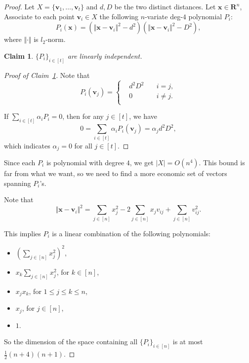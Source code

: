 \documentclass{article}
\newtheorem{claim}[theorem]{Claim}
\theoremstyle{definition}
\begin{document}
\begin{proof}
    Let $X=\{ \boldsymbol{v}_{1},\ldots,\boldsymbol{v}_{t} \}$ and $d,D$ be the two distinct distances. Let $\boldsymbol{x}\in \mathbf{R}^{n}$, Associate to each point $\boldsymbol{v}_{i}\in X$ the following $n$-variate deg-$4$ polynomial $P_{i}$:
    $$P_{i}(\boldsymbol{x})=(\Vert \boldsymbol{x}-\boldsymbol{v}_{i} \Vert^{2}-d^{2})(\Vert \boldsymbol{x}-\boldsymbol{v}_{i} \Vert^{2}-D^{2}),$$
    where $\Vert \cdot \Vert$ is $l_{2}$-norm.

    \begin{claim}\label{pi linearly independent}
        $\{ P_{i} \}_{i\in [t]}$ are linearly independent.
    \end{claim}
    \begin{proof}[Proof of Claim~\ref{pi linearly independent}]
        Note that
        $$P_{i}(\boldsymbol{v}_{j})=\left\{
    	\begin{aligned}
    	&d^{2}D^{2} \quad &i=j,\\
    	&0 \quad &i\neq j.\\
    	\end{aligned}
    	\right
    	.
        $$

        If $\sum_{i\in [t]}\alpha_{i}P_{i}=0$, then for any $j\in [t]$, we have
        $$0=\sum_{i\in [t]}\alpha_{i}P_{i}(\boldsymbol{v}_{j})=\alpha_{j}d^{2}D^{2},$$
        which indicates $\alpha_{j}=0$ for all $j\in [t]$.
    \end{proof}

    Since each $P_{i}$ is polynomial with degree $4$, we get $|X|=O(n^{4})$. This bound is far from what we want, so we need to find a more economic set of vectors spanning $P_{i}$'s.

    Note that
    $$\Vert \boldsymbol{x}-\boldsymbol{v}_{i} \Vert^{2}=\sum_{j\in [n]} x_{j}^{2}-2\sum_{j\in[n]}x_{j}v_{ij}+\sum_{j\in [n]}v_{ij}^{2}.$$

    This implies $P_{i}$ is a linear combination of the following polynomials:
    
    \begin{itemize}
        \item $(\sum_{j\in [n]} x_{j}^{2})^{2}$,
        \item $x_{k}\sum_{j\in [n]}x_{j}^{2}$, for $k\in [n]$,
        \item $x_{j}x_{k}$, for $1\leq j\leq k\leq n$,
        \item $x_{j}$, for $j\in [n]$,
        \item $1$.
    \end{itemize}

    So the dimension of the space containing all $\{ P_{i} \}_{i\in [n]}$ is at most $\frac{1}{2}(n+4)(n+1)$.
\end{proof}
\end{document}
